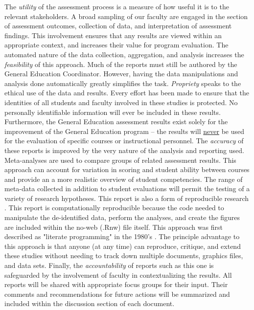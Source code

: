 \documentclass[fleqn,10pt]{SelfArx}\usepackage[]{graphicx}\usepackage[]{color}
\begin{document}
The \textit{utility} of the assessment process is a measure of how useful it is to the relevant stakeholders. A broad sampling of our faculty are engaged in the section of assessment outcomes, collection of data, and interpretation of assessment findings. This involvement ensures that any results are viewed within an appropriate context, and increases their value for program evaluation. The automated nature of the data collection, aggregation, and analysis increases the \textit{feasibility} of this approach. Much of the reports must still be authored by the General Education Coordinator. However, having the data manipulations and analysis done automatically greatly simplifies the task. \textit{Propriety} speaks to the ethical use of the data and results. Every effort has been made to ensure that the identities of all students and faculty involved in these studies is protected. No personally identifiable information will ever be included in these results. Furthermore, the General Education assessment results exist solely for the improvement of the General Education program -- the results will \underline{never} be used for the evaluation of specific courses or instructional personnel. The \textit{accuracy} of these reports is improved by the very nature of the analysis and reporting used. Meta-analyses \citep{Borenstein2011} are used to compare groups of related assessment results. This approach can account for variation in scoring and student ability between courses and provide an a more realistic overview of student competencies. The range of meta-data collected in addition to student evaluations will permit the testing of a variety of research hypotheses. This report is also a form of reproducible research \citep{Stodden2014}. This report is computationally reproducible because the code needed to manipulate the de-identified data, perform the analyses, and create the figures are included within the no-web (.Rnw) file itself. This approach was first described as "literate programming" in the 1980's \citep{Knuth1984}. The principle advantage to this approach is that anyone (at any time) can reproduce, critique, and extend these studies without needing to track down multiple documents, graphics files, and data sets. Finally, the \textit{accountability} of reports such as this one is safeguarded by the involvement of faculty in contextualizing the results. All reports will be shared with appropriate focus groups for their input. Their comments and recommendations for future actions will be summarized and included within the discussion section of each document.
\end{document}
